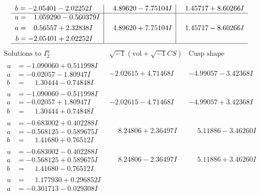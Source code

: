 \documentclass[1p]{elsarticle_modified}
\theoremstyle{definition}
\newcommand{\I}{\sqrt{-1}}
\begin{document}
$$\begin{array}{c|c|c}
\begin{aligned}
b &= -2.05401 - 2.02252 I\end{aligned}
 & \phantom{-}4.89620 - 7.75104 I & \phantom{-}1.45717 + 8.60266 I \\ \hline\begin{aligned}
u &= \phantom{-}1.059290 - 0.560379 I \\
a &= \phantom{-}0.56557 + 2.32838 I \\
b &= -2.05401 + 2.02252 I\end{aligned}
 & \phantom{-}4.89620 + 7.75104 I & \phantom{-}1.45717 - 8.60266 I\\
 \hline 
 \end{array}$$\newpage$$\begin{array}{c|c|c}  
\text{Solutions to }I^u_{2}& \I (\text{vol} + \sqrt{-1}CS) & \text{Cusp shape}\\
 \hline 
\begin{aligned}
u &= -1.090060 + 0.511998 I \\
a &= -0.02057 - 1.80947 I \\
b &= \phantom{-}1.30444 - 0.74848 I\end{aligned}
 & -2.02615 + 4.71468 I & -4.99057 - 3.42368 I \\ \hline\begin{aligned}
u &= -1.090060 - 0.511998 I \\
a &= -0.02057 + 1.80947 I \\
b &= \phantom{-}1.30444 + 0.74848 I\end{aligned}
 & -2.02615 - 4.71468 I & -4.99057 + 3.42368 I \\ \hline\begin{aligned}
u &= -0.683002 + 0.402288 I \\
a &= -0.568125 - 0.589675 I \\
b &= \phantom{-}1.41680 + 0.76512 I\end{aligned}
 & \phantom{-}8.24806 + 2.36497 I & \phantom{-}5.11886 - 3.46260 I \\ \hline\begin{aligned}
u &= -0.683002 - 0.402288 I \\
a &= -0.568125 + 0.589675 I \\
b &= \phantom{-}1.41680 - 0.76512 I\end{aligned}
 & \phantom{-}8.24806 - 2.36497 I & \phantom{-}5.11886 + 3.46260 I \\ \hline\begin{aligned}
u &= \phantom{-}1.177930 + 0.296852 I \\
a &= -0.301713 - 0.029308 I \\

\end{aligned}
\end{array}$$
\end{document}
